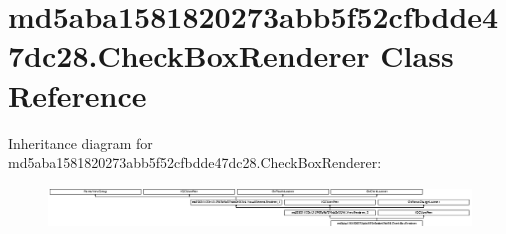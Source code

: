 \hypertarget{classmd5aba1581820273abb5f52cfbdde47dc28_1_1CheckBoxRenderer}{}\section{md5aba1581820273abb5f52cfbdde47dc28.\+Check\+Box\+Renderer Class Reference}
\label{classmd5aba1581820273abb5f52cfbdde47dc28_1_1CheckBoxRenderer}
Inheritance diagram for md5aba1581820273abb5f52cfbdde47dc28.\+Check\+Box\+Renderer\+:\begin{figure}[H]
\begin{center}
\leavevmode
\includegraphics[height=1.098039cm]{classmd5aba1581820273abb5f52cfbdde47dc28_1_1CheckBoxRenderer}
\end{center}
\end{figure}
